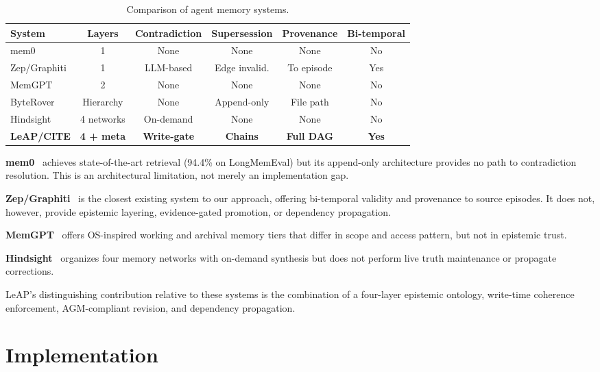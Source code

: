 \documentclass[11pt,letterpaper]{article}
\begin{document}
\begin{table}[H]
\centering
\caption{Comparison of agent memory systems.}
\label{tab:comparison}
\begin{tabular}{@{}lccccc@{}}
\toprule
\textbf{System} & \textbf{Layers} & \textbf{Contradiction} & \textbf{Supersession} & \textbf{Provenance} & \textbf{Bi-temporal} \\
\midrule
mem0 & 1 & None & None & None & No \\
Zep/Graphiti & 1 & LLM-based & Edge invalid. & To episode & Yes \\
MemGPT & 2 & None & None & None & No \\
ByteRover & Hierarchy & None & Append-only & File path & No \\
Hindsight & 4 networks & On-demand & None & None & No \\
\textbf{LeAP/CITE} & \textbf{4 + meta} & \textbf{Write-gate} & \textbf{Chains} & \textbf{Full DAG} & \textbf{Yes} \\
\bottomrule
\end{tabular}
\end{table}

\textbf{mem0}~\cite{mem0} achieves state-of-the-art retrieval (94.4\% on LongMemEval) but its append-only architecture provides no path to contradiction resolution. This is an architectural limitation, not merely an implementation gap.

\textbf{Zep/Graphiti}~\cite{graphiti2025} is the closest existing system to our approach, offering bi-temporal validity and provenance to source episodes. It does not, however, provide epistemic layering, evidence-gated promotion, or dependency propagation.

\textbf{MemGPT}~\cite{memgpt2023} offers OS-inspired working and archival memory tiers that differ in scope and access pattern, but not in epistemic trust.

\textbf{Hindsight}~\cite{hindsight} organizes four memory networks with on-demand synthesis but does not perform live truth maintenance or propagate corrections.

LeAP's distinguishing contribution relative to these systems is the combination of a four-layer epistemic ontology, write-time coherence enforcement, AGM-compliant revision, and dependency propagation.

\section{Implementation}
\end{document}
